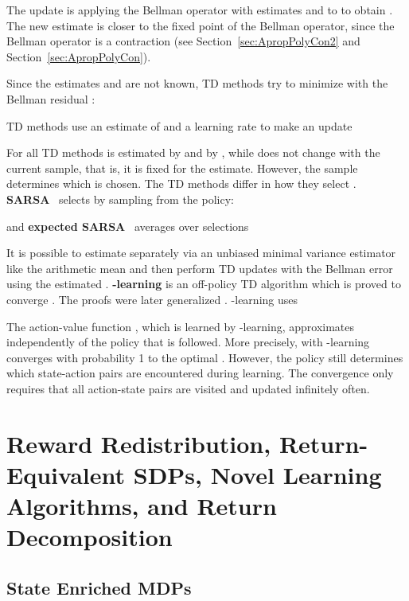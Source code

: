 \documentclass{article}
\begin{document}
\begin{appendices}
The update is applying the Bellman operator with estimates
 and
 to  to obtain
.
The new estimate  is closer to
the fixed point  of the Bellman operator,
since the Bellman operator is a contraction
(see Section~\ref{sec:ApropPolyCon2}
and Section~\ref{sec:ApropPolyCon}).

Since the estimates  and  are not known,
TD methods try to minimize  with the Bellman residual :

TD methods use an estimate  of  and a learning
rate  to make an update

For all TD methods  is estimated by  and  by
, while
 does not change with the
current sample, that is, it is fixed for the estimate.
However, the sample determines which  is chosen.
The TD methods differ in how they select .
{\bf SARSA}~\cite{Rummery:94} selects  by sampling from the policy:

and {\bf expected SARSA}~\cite{John:94} averages over selections

It is possible to estimate  separately via an unbiased 
minimal variance estimator
like the arithmetic mean and then 
perform TD updates with the Bellman error
using the estimated  \cite{Romoff:18}.
{\bf -learning} \cite{Watkins:89} is  an
off-policy TD algorithm which is proved
to converge \cite{Watkins:92,Dayan:92}. The proofs were later generalized 
\cite{Jaakkola:94,Tsitsiklis:94}.
-learning uses

The action-value function , which is learned by -learning, approximates 
independently of the policy that is followed. More precisely,
with -learning  converges with probability 1 to the optimal .
However, the policy still
determines which state-action pairs are encountered during learning.
The convergence only requires that all action-state pairs are visited and
updated infinitely often.




\section{Reward Redistribution, Return-Equivalent SDPs, Novel Learning Algorithms, 
         and Return Decomposition}
\label{c:RR}

\subsection{State Enriched MDPs}
\label{sec:AStateEnriched}


\end{appendices}
\end{document}
